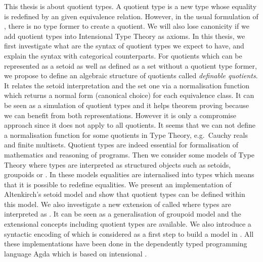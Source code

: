 {This thesis is about quotient types. A quotient type is a new type whose equality is redefined by an given equivalence relation. However, in the usual formulation of \itt, there is no type former to create a quotient. We will also lose canonicity if we add quotient types into Intensional Type Theory as axioms. In this thesis, we first investigate what are the syntax of quotient types we expect to have, and explain the syntax with categorical counterparts. For quotients which can be represented as a setoid as well as defined as a set without a quotient type former, we propose to define an algebraic structure of quotients called \emph{definable quotients}. It relates the setoid interpretation and the set one via a normalisation function which returns a normal form (canonical choice) for each equivalence class. It can be seen as a simulation of quotient types and it helps theorem proving because we can benefit from both representations. However it is only a compromise approach since it does not apply to all quotients. It seems that we can not define a normalisation function for some quotients in Type Theory, e.g.\ Cauchy reals and finite multisets. Quotient types are indeed essential for formalisation of mathematics and reasoning of programs. Then we consider some models of Type Theory where types are interpreted as structured objects such as setoids, groupoids or \wog. In these models equalities are internalised into types which means that it is possible to redefine equalities. We present an implementation of Altenkirch's \cite{alti:lics99} setoid model  and show that quotient types can be defined within this model. We also investigate a new extension of \mltt called \hott where types are interpreted as \wog. It can be seen as a generalisation of groupoid model and the extensional concepts including quotient types are available. We also introduce a syntactic encoding of \wog which is considered as a first step to build a \wog model in \itt. All these implementations have been done in the dependently typed programming language Agda which is based on intensional \mltt.

}
